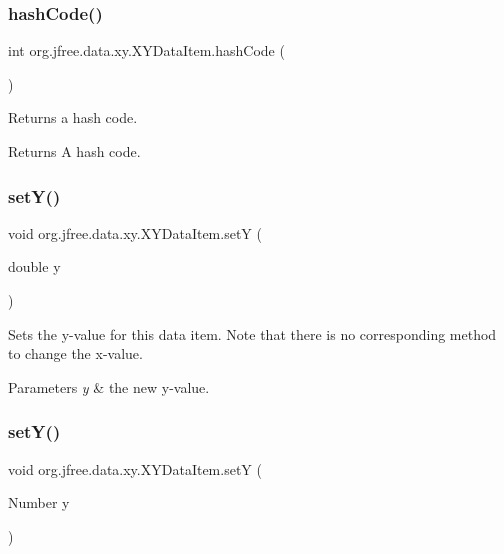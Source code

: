 \subsubsection{\texorpdfstring{hash\+Code()}{hashCode()}}
{\footnotesize\ttfamily int org.\+jfree.\+data.\+xy.\+X\+Y\+Data\+Item.\+hash\+Code (\begin{DoxyParamCaption}{ }\end{DoxyParamCaption})}

Returns a hash code.

\begin{DoxyReturn}{Returns}
A hash code. 
\end{DoxyReturn}
\mbox{\label{classorg_1_1jfree_1_1data_1_1xy_1_1_x_y_data_item_a0405c75813b0fa44e5a2f7bf3f31035b}} 
\subsubsection{\texorpdfstring{set\+Y()}{setY()}\hspace{0.1cm}{\footnotesize\ttfamily [1/2]}}
{\footnotesize\ttfamily void org.\+jfree.\+data.\+xy.\+X\+Y\+Data\+Item.\+setY (\begin{DoxyParamCaption}\item[{double}]{y }\end{DoxyParamCaption})}

Sets the y-\/value for this data item. Note that there is no corresponding method to change the x-\/value.


\begin{DoxyParams}{Parameters}
{\em y} & the new y-\/value. \\
\hline
\end{DoxyParams}
\mbox{\label{classorg_1_1jfree_1_1data_1_1xy_1_1_x_y_data_item_a1a3182d47320b47a63b47573a5920652}} 
\subsubsection{\texorpdfstring{set\+Y()}{setY()}\hspace{0.1cm}{\footnotesize\ttfamily [2/2]}}
{\footnotesize\ttfamily void org.\+jfree.\+data.\+xy.\+X\+Y\+Data\+Item.\+setY (\begin{DoxyParamCaption}\item[{Number}]{y }\end{DoxyParamCaption})}

